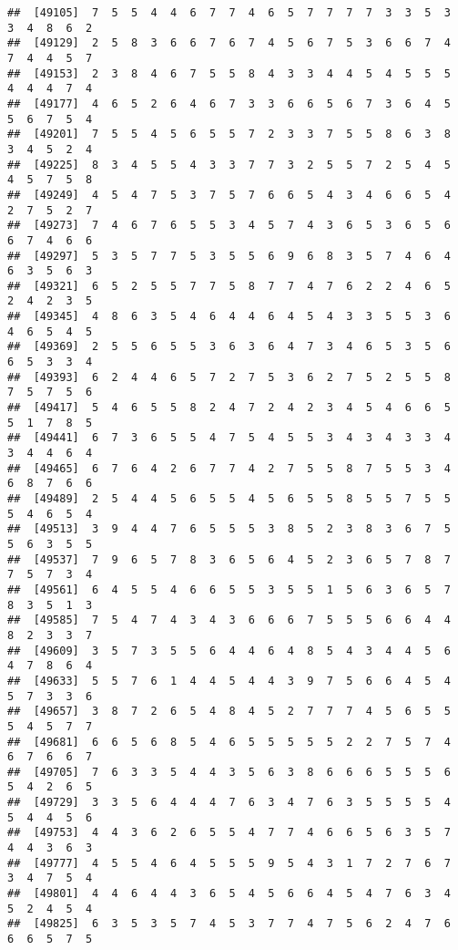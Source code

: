 \documentclass[
]{book}
\begin{document}
\begin{verbatim}
##  [49105]  7  5  5  4  4  6  7  7  4  6  5  7  7  7  7  3  3  5  3  3  4  8  6  2
##  [49129]  2  5  8  3  6  6  7  6  7  4  5  6  7  5  3  6  6  7  4  7  4  4  5  7
##  [49153]  2  3  8  4  6  7  5  5  8  4  3  3  4  4  5  4  5  5  5  4  4  4  7  4
##  [49177]  4  6  5  2  6  4  6  7  3  3  6  6  5  6  7  3  6  4  5  5  6  7  5  4
##  [49201]  7  5  5  4  5  6  5  5  7  2  3  3  7  5  5  8  6  3  8  3  4  5  2  4
##  [49225]  8  3  4  5  5  4  3  3  7  7  3  2  5  5  7  2  5  4  5  4  5  7  5  8
##  [49249]  4  5  4  7  5  3  7  5  7  6  6  5  4  3  4  6  6  5  4  2  7  5  2  7
##  [49273]  7  4  6  7  6  5  5  3  4  5  7  4  3  6  5  3  6  5  6  6  7  4  6  6
##  [49297]  5  3  5  7  7  5  3  5  5  6  9  6  8  3  5  7  4  6  4  6  3  5  6  3
##  [49321]  6  5  2  5  5  7  7  5  8  7  7  4  7  6  2  2  4  6  5  2  4  2  3  5
##  [49345]  4  8  6  3  5  4  6  4  4  6  4  5  4  3  3  5  5  3  6  4  6  5  4  5
##  [49369]  2  5  5  6  5  5  3  6  3  6  4  7  3  4  6  5  3  5  6  6  5  3  3  4
##  [49393]  6  2  4  4  6  5  7  2  7  5  3  6  2  7  5  2  5  5  8  7  5  7  5  6
##  [49417]  5  4  6  5  5  8  2  4  7  2  4  2  3  4  5  4  6  6  5  5  1  7  8  5
##  [49441]  6  7  3  6  5  5  4  7  5  4  5  5  3  4  3  4  3  3  4  3  4  4  6  4
##  [49465]  6  7  6  4  2  6  7  7  4  2  7  5  5  8  7  5  5  3  4  6  8  7  6  6
##  [49489]  2  5  4  4  5  6  5  5  4  5  6  5  5  8  5  5  7  5  5  5  4  6  5  4
##  [49513]  3  9  4  4  7  6  5  5  5  3  8  5  2  3  8  3  6  7  5  5  6  3  5  5
##  [49537]  7  9  6  5  7  8  3  6  5  6  4  5  2  3  6  5  7  8  7  7  5  7  3  4
##  [49561]  6  4  5  5  4  6  6  5  5  3  5  5  1  5  6  3  6  5  7  8  3  5  1  3
##  [49585]  7  5  4  7  4  3  4  3  6  6  6  7  5  5  5  6  6  4  4  8  2  3  3  7
##  [49609]  3  5  7  3  5  5  6  4  4  6  4  8  5  4  3  4  4  5  6  4  7  8  6  4
##  [49633]  5  5  7  6  1  4  4  5  4  4  3  9  7  5  6  6  4  5  4  5  7  3  3  6
##  [49657]  3  8  7  2  6  5  4  8  4  5  2  7  7  7  4  5  6  5  5  5  4  5  7  7
##  [49681]  6  6  5  6  8  5  4  6  5  5  5  5  5  2  2  7  5  7  4  6  7  6  6  7
##  [49705]  7  6  3  3  5  4  4  3  5  6  3  8  6  6  6  5  5  5  6  5  4  2  6  5
##  [49729]  3  3  5  6  4  4  4  7  6  3  4  7  6  3  5  5  5  5  4  5  4  4  5  6
##  [49753]  4  4  3  6  2  6  5  5  4  7  7  4  6  6  5  6  3  5  7  4  4  3  6  3
##  [49777]  4  5  5  4  6  4  5  5  5  9  5  4  3  1  7  2  7  6  7  3  4  7  5  4
##  [49801]  4  4  6  4  4  3  6  5  4  5  6  6  4  5  4  7  6  3  4  5  2  4  5  4
##  [49825]  6  3  5  3  5  7  4  5  3  7  7  4  7  5  6  2  4  7  6  6  6  5  7  5

\end{verbatim}
\end{document}
